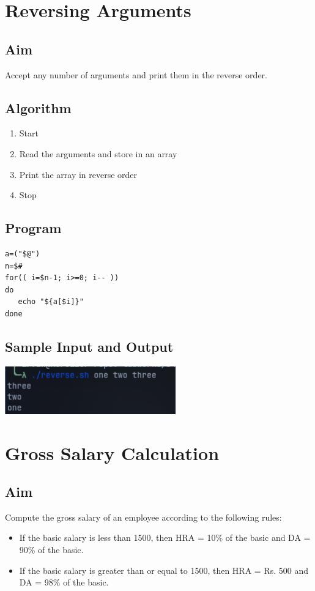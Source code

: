\section{Reversing Arguments}

\subsection{Aim}
Accept any number of arguments and print them in the reverse order.

\subsection{Algorithm}
\begin{enumerate}
   \item Start
   \item Read the arguments and store in an array
   \item Print the array in reverse order
   \item Stop
\end{enumerate}

\subsection{Program}
\begin{lstlisting}[label={list:program:reverse_args}]
a=("$@")
n=$#
for(( i=$n-1; i>=0; i-- ))
do
   echo "${a[$i]}"
done
\end{lstlisting}

\subsection{Sample Input and Output}
\includegraphics[]{Cycle_1//Outputs/revers.png}

\section{Gross Salary Calculation}

\subsection{Aim}
Compute the gross salary of an employee according to the following rules:
\begin{itemize}
   \item If the basic salary is less than 1500, then HRA = 10\% of the basic and DA = 90\% of the basic.
   \item If the basic salary is greater than or equal to 1500, then HRA = Rs. 500 and DA = 98\% of the basic.
\end{itemize}


